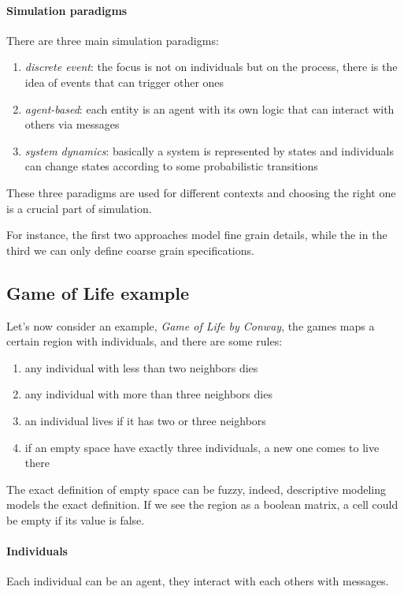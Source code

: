 \paragraph{Simulation paradigms}
There are three main simulation paradigms:
\begin{enumerate}
    \item \emph{discrete event}: the focus is not on individuals but on the process, 
    there is the idea of events that can trigger other ones  
    \item \emph{agent-based}: each entity is an agent with its own logic that can 
    interact with others via messages
    \item \emph{system dynamics}: basically a system is represented by states and 
    individuals can change states according to some probabilistic transitions
\end{enumerate}
These three paradigms are used for different contexts and choosing the right one 
is a crucial part of simulation. 

For instance, the first two approaches model fine grain details, 
while the in the third we can only define coarse grain specifications.

\subsection{Game of Life example}
Let's now consider an example, \emph{Game of Life by Conway}, the games 
maps a certain region with individuals, and there are some rules:
\begin{enumerate}
    \item any individual with less than two neighbors dies
    \item any individual with more than three neighbors dies
    \item an individual lives if it has two or three neighbors
    \item if an empty space have exactly three individuals, 
    a new one comes to live there
\end{enumerate}

\begin{remark}
    The exact definition of empty space can be fuzzy, indeed, descriptive 
    modeling models the exact definition. If we see the region as 
    a boolean matrix, a cell could be empty if its value is false. 
\end{remark}

\paragraph{Individuals}
Each individual can be an agent, they interact with each others with
messages.

